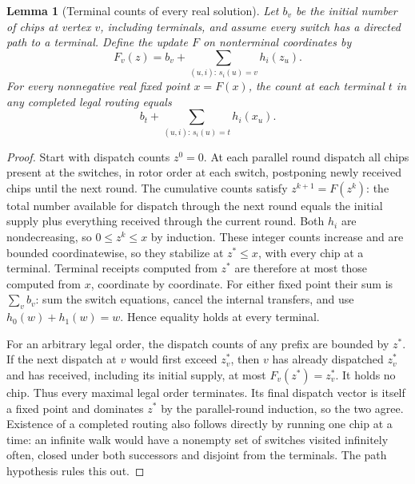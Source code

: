 \documentclass[11pt,oneside,openany,notitlepage]{report}
\newtheorem{lemma}[theorem]{Lemma}
\begin{document}
\begin{lemma}[Terminal counts of every real solution]\label{lem:real-terminal}
Let \(b_v\) be the initial number of chips at vertex \(v\), including
terminals, and assume every switch has a directed path to a terminal.
Define the update \(F\) on nonterminal coordinates by
\[
 F_v(z)=b_v+\sum_{(u,i):\,s_i(u)=v}h_i(z_u).
\]
For every nonnegative real fixed point \(x=F(x)\), the count at each
terminal \(t\) in any completed legal routing equals
\[
                       b_t+\sum_{(u,i):\,s_i(u)=t}h_i(x_u).
\]
\end{lemma}
\begin{proof}
Start with dispatch counts \(z^0=0\). At each parallel round dispatch all
chips present at the switches, in rotor order at each switch, postponing
newly received chips until the next round. The cumulative counts satisfy
\(z^{k+1}=F(z^k)\): the total number available for dispatch through the
next round equals the initial supply plus everything received through the
current round. Both \(h_i\) are nondecreasing, so \(0\le z^k\le x\) by
induction. These integer counts increase and are bounded coordinatewise,
so they stabilize at \(z^*\le x\), with every chip at a terminal. Terminal
receipts computed from \(z^*\) are therefore at most those computed from
\(x\), coordinate by coordinate. For either fixed point their sum is
\(\sum_v b_v\): sum the switch equations, cancel the internal transfers,
and use \(h_0(w)+h_1(w)=w\). Hence equality holds at every terminal.

For an arbitrary legal order, the dispatch counts of any prefix are
bounded by \(z^*\). If the next dispatch at \(v\) would first exceed
\(z^*_v\), then \(v\) has already dispatched \(z^*_v\) and has received,
including its initial supply, at most \(F_v(z^*)=z^*_v\). It holds no chip.
Thus every maximal legal order terminates. Its final dispatch vector is
itself a fixed point and dominates \(z^*\) by the parallel-round induction,
so the two agree. Existence of a completed routing also follows directly
by running one chip at a time: an infinite walk would have a nonempty
set of switches visited infinitely often, closed under both successors
and disjoint from the terminals. The path hypothesis rules this out.
\end{proof}
\end{document}
